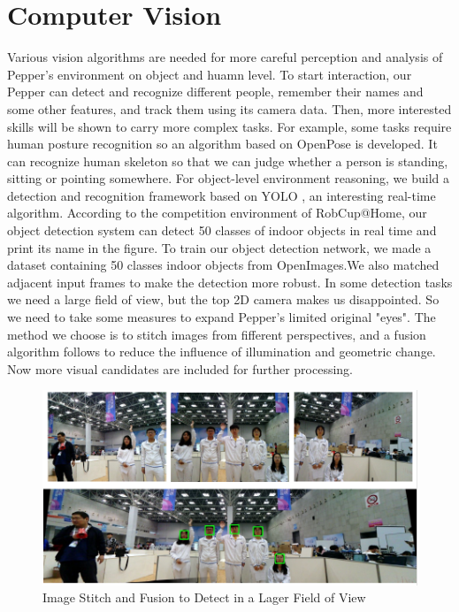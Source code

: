 \section{Computer Vision}
\label{sec:vision}
Various vision algorithms are needed for more careful perception and analysis of Pepper's environment on object and huamn level. 
To start interaction, our Pepper can detect and recognize different people, remember their names and some other features, and track them using its camera data. 
Then, more interested skills will be shown to carry more complex tasks. For example, some tasks require human posture recognition so an algorithm based on OpenPose \cite{Cao_2017_CVPR} is developed. 
It can recognize human skeleton so that we can judge whether a person is standing, sitting or pointing somewhere. For object-level environment reasoning, we build a detection and recognition framework based on YOLO \cite{Redmon2018YOLOv3AI}, an interesting real-time algorithm. 
According to the competition environment of RobCup@Home, our object detection system can detect 50 classes of indoor objects in real time and print its name in the figure.
To train our object detection network, we made a dataset containing 50 classes indoor objects from OpenImages.We also matched adjacent input frames to make the detection more robust.
In some detection tasks we need a large field of view, but the top 2D camera makes us disappointed. So we need to take some measures to expand Pepper's limited original "eyes".
The method we choose is to stitch images from fifferent perspectives, and a fusion algorithm follows to reduce the influence of illumination and geometric change.
Now more visual candidates are included for further processing.
\begin{figure}[h!]
\centering
\includegraphics[width=1.\textwidth]{figs/vision1.png}
\caption{Image Stitch and Fusion to Detect in a Lager Field of View}
\label{fig:vision1}
\end{figure}
